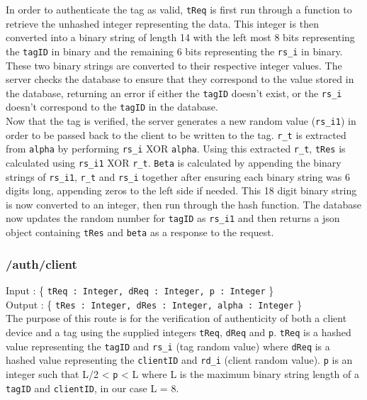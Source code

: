 In order to authenticate the tag as valid, \verb|tReq| is first run through a function to retrieve the unhashed integer representing the data. This integer is then converted into a binary string of length 14 with the left most 8 bits representing the \verb|tagID| in binary and the remaining 6 bits representing the \verb|rs_i| in binary. These two binary strings are converted to their respective integer values. The server checks the database to ensure that they correspond to the value stored in the database, returning an error if either the \verb|tagID| doesn’t exist, or the \verb|rs_i| doesn’t correspond to the \verb|tagID| in the database.\\
 
Now that the tag is verified, the server generates a new random value (\verb|rs_i1|) in order to be passed back to the client to be written to the tag. \verb|r_t| is extracted from \verb|alpha| by performing \verb|rs_i| XOR \verb|alpha|. Using this extracted \verb|r_t|, \verb|tRes| is calculated using \verb|rs_i1| XOR \verb|r_t|. \verb|Beta| is calculated by appending the binary strings of \verb|rs_i1|, \verb|r_t| and \verb|rs_i| together after ensuring each binary string was 6 digits long, appending zeros to the left side if needed. This 18 digit binary string is now converted to an integer, then run through the hash function. The database now updates the random number for \verb|tagID| as \verb|rs_i1| and then returns a json object containing \verb|tRes| and \verb|beta| as a response to the request.
 
\subsubsection{/auth/client}
 
Input : \{ \verb|tReq : Integer, dReq : Integer, p : Integer| \}\\
Output : \{ \verb|tRes : Integer, dRes : Integer, alpha : Integer| \}\\
 
The purpose of this route is for the verification of authenticity of both a client device and a tag using the supplied integers \verb|tReq|, \verb|dReq| and \verb|p|. \verb|tReq| is a hashed value representing the \verb|tagID| and \verb|rs_i| (tag random value) where \verb|dReq| is a hashed value representing the \verb|clientID| and \verb|rd_i| (client random value). \verb|p| is an integer such that L/2 < \verb|p| < L where L is the maximum binary string length of a \verb|tagID| and \verb|clientID|, in our case L = 8.\\
 
